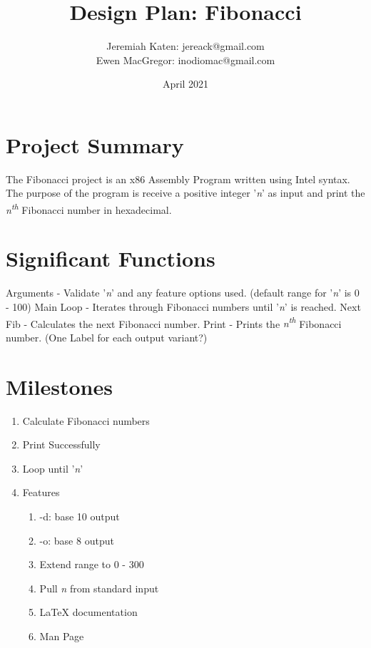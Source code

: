 \documentclass{article}
\title{Design Plan: Fibonacci}
\author{Jeremiah Katen: jereack@gmail.com \\ Ewen MacGregor: inodiomac@gmail.com}
\date{April 2021}
\begin{document}
\maketitle

\section{Project Summary}
The Fibonacci project is an x86 Assembly Program written using Intel syntax. The purpose of the program is receive a positive integer '\textit{n}' as input and print the \textit{n\textsuperscript{th}} Fibonacci number in hexadecimal.

\section{Significant Functions}
Arguments - Validate '\textit{n}' and any feature options used. \newline
\indent  (default range for '\textit{n}' is 0 - 100) \newline
Main Loop - Iterates through Fibonacci numbers until '\textit{n}' is reached. \newline
Next Fib - Calculates the next Fibonacci number. \newline
Print - Prints the \textit{n\textsuperscript{th}} Fibonacci number. \newline
\indent (One Label for each output variant?) \newline

\section{Milestones}
\begin{enumerate}
    \item Calculate Fibonacci numbers
    \item Print Successfully
    \item Loop until '\textit{n}'
    \item Features
    \begin{enumerate}
        \item -d: base 10 output
        \item -o: base 8 output
        \item Extend range to 0 - 300
        \item Pull \textit{n} from standard input
        \item LaTeX documentation
        \item Man Page
    \end{enumerate}
\end{enumerate} 
\end{document}
